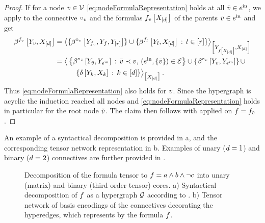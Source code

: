 \begin{proof}
    If for a node $v\in\mathcal{V}$ \eqref{eq:nodeFormulaRepresentation} holds at all $\bar{v}\in e^{\mathrm{in}}$, we apply  to the connective $\circ_{v}$ and the formulas $f_{\bar{v}}\left[X_{[d]}\right]$ of the parents $\bar{v}\in e^{\mathrm{in}}$ and get
    \begin{align*}
        \bencodingofat{\formulaof{\node}}{\headvariableof{\node},\shortcatvariables}
        &= \contractionof{
            \{\bencodingofat{\connectiveof{\node}}{\headvariableof{\formulaof{\node}},\formulavar,\headvariableof{[\secatomorder]}}\}
            \cup \{\bencodingofat{\formulaof{\secatomenumerator}}{\headvariableof{\secatomenumerator},\shortcatvariables} \wcols \secatomenumeratorin \}
        }{\headvariableof{\formulaat{\shortcatvariables}},\shortcatvariables} \\
        & = \breakablecontractionof{
            \left\{
                \bencodingofat{\connectiveof{\thirdnode}}{\headvariableof{\thirdnode},\headvariableof{\incomingnodes}} \wcols \thirdnode\prec\node \ncond (\incomingnodes,\{\thirdnode\})\in\edges
            \right\} \cup \left\{\bencodingofat{\connectiveof{\node}}{\headvariableof{\node},\headvariableof{\incomingnodes}}\right\} \cup \\
            & \quad\quad\quad \{\identityat{\headvariableof{\atomenumerator},\catvariableof{\atomenumerator}} \wcols \atomenumeratorin\}
        }{\shortcatvariables} \, .
    \end{align*}
    Thus \eqref{eq:nodeFormulaRepresentation} also holds for $v$.
    Since the hypergraph is acyclic the induction reached all nodes and \eqref{eq:nodeFormulaRepresentation} holds in particular for the root node $\tilde{v}$.
    The claim then follows with  applied on $f=f_{\tilde{v}}$.
\end{proof}

An example of a syntactical decomposition is provided in a, and the corresponding tensor network representation in b.
Examples of unary ($d=1$) and binary ($d=2$) connectives are further provided in .

\begin{figure}[t]
    \begin{center}
        
    \end{center}
    \caption{Decomposition of the formula tensor to $f = a \land b \land \lnot c$ into unary (matrix) and binary (third order tensor) cores.
    a) Syntactical decomposition of $f$ as a hypergraph $\mathcal{G}$ according to .
    b) Tensor network of basis encodings of the connectives decorating the hyperedges, which represents by  the formula $f$.
    }
    \label{fig:decompositionExample}
\end{figure}

